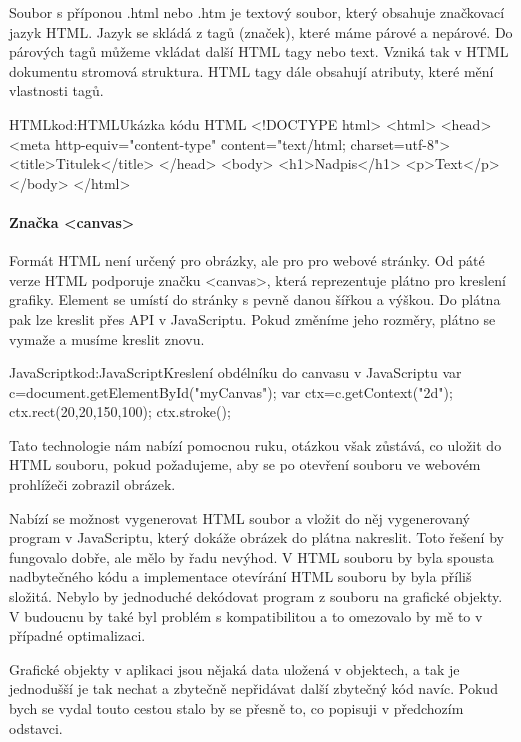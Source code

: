 \documentclass[
  field=inf,
  biblatex=false,
  glossaries,
  index
]{kidiplom}
\begin{document}
Soubor s příponou .html nebo .htm je textový soubor, který obsahuje značkovací jazyk HTML. Jazyk se skládá z tagů (značek), které máme párové a nepárové. Do párových tagů můžeme vkládat další HTML tagy nebo text. Vzniká tak v HTML dokumentu stromová struktura. HTML tagy dále obsahují atributy, které mění vlastnosti tagů.

\begin{kicode}{HTML}{kod:HTML}{Ukázka kódu HTML}
<!DOCTYPE html>
<html>
  <head>
  <meta http-equiv="content-type" content="text/html; charset=utf-8">
  <title>Titulek</title>
  </head>
  <body>
    <h1>Nadpis</h1>
    <p>Text</p>
  </body>
</html>
\end{kicode}

\paragraph{Značka <canvas>}

Formát HTML není určený pro obrázky, ale pro pro webové stránky. Od páté verze HTML podporuje značku <canvas>, která reprezentuje plátno pro kreslení grafiky. Element se umístí do stránky s pevně danou šířkou a výškou. Do plátna pak lze kreslit přes API v JavaScriptu. Pokud změníme jeho rozměry, plátno se vymaže a musíme kreslit znovu.

\begin{kicode}{JavaScript}{kod:JavaScript}{Kreslení obdélníku do canvasu v JavaScriptu}
var c=document.getElementById("myCanvas");
var ctx=c.getContext("2d");
ctx.rect(20,20,150,100);
ctx.stroke();
\end{kicode}

Tato technologie nám nabízí pomocnou ruku, otázkou však zůstává, co uložit do HTML souboru, pokud požadujeme, aby se po otevření souboru ve webovém prohlížeči zobrazil obrázek.

Nabízí se možnost vygenerovat HTML soubor a vložit do něj vygenerovaný program v JavaScriptu, který dokáže obrázek do plátna nakreslit. Toto řešení by fungovalo dobře, ale mělo by řadu nevýhod. V HTML souboru by byla spousta nadbytečného kódu a implementace otevírání HTML souboru by byla příliš složitá. Nebylo by jednoduché dekódovat program z souboru na grafické objekty. V budoucnu by také byl problém s kompatibilitou a to omezovalo by mě to v případné optimalizaci.

Grafické objekty v aplikaci jsou nějaká data uložená v objektech, a tak je jednodušší je tak nechat a zbytečně nepřidávat další zbytečný kód navíc. Pokud bych se vydal touto cestou stalo by se přesně to, co popisuji v předchozím odstavci.
\end{document}
